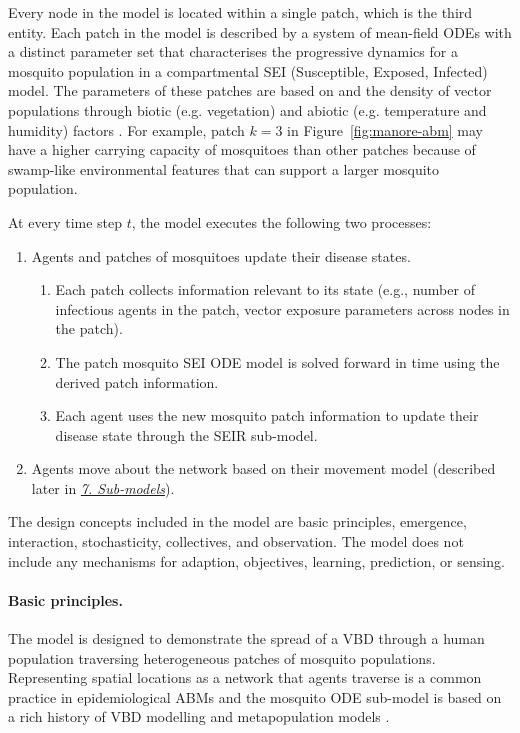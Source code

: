 Every node in the model is located within a single patch, which is the third entity. Each patch in the model is described by a system of mean-field ODEs with a distinct parameter set that characterises the progressive dynamics for a mosquito population in a compartmental SEI (Susceptible, Exposed, Infected) model. The parameters of these patches are based on  and the density of vector populations through biotic (e.g. vegetation) and abiotic (e.g. temperature and humidity) factors \cite{manore_network-patch_2015}. For example, patch $k=3$ in Figure~\ref{fig:manore-abm} may have a higher carrying capacity of mosquitoes than other patches because of swamp-like environmental features that can support a larger mosquito population.


At every time step $t$, the model executes the following two processes:

\begin{enumerate}
    \item Agents and patches of mosquitoes update their disease states.
    \begin{enumerate}
        \item Each patch collects information relevant to its state (e.g., number of infectious agents in the patch, vector exposure parameters across nodes in the patch).
        \item The patch mosquito SEI ODE model is solved forward in time using the derived patch information.
        \item Each agent uses the new mosquito patch information to update their disease state through the SEIR sub-model.
    \end{enumerate}
    \item Agents move about the network based on their movement model (described later in \hyperref[oddsec:submodels]{\textit{7. Sub-models}}).
\end{enumerate}


The design concepts included in the model are basic principles, emergence, interaction, stochasticity, collectives, and observation. The model does not include any mechanisms for adaption, objectives, learning, prediction, or sensing.

\paragraph{Basic principles.} The model is designed to demonstrate the spread of a VBD through a human population traversing heterogeneous patches of mosquito populations. Representing spatial locations as a network that agents traverse is a common practice in epidemiological ABMs \cite{vizanko_modeling_2024, mao_modeling_2014, frias-martinez_agent-based_2011} and the mosquito ODE sub-model is based on a rich history of VBD modelling and metapopulation models \cite{mniszewski_towards_2014}.


